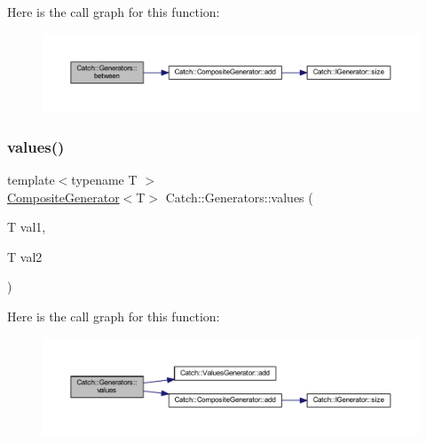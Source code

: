 Here is the call graph for this function\+:\nopagebreak
\begin{figure}[H]
\begin{center}
\leavevmode
\includegraphics[width=350pt]{namespace_catch_1_1_generators_a030abfa7ee3c58d909cf6a6aa0405265_cgraph}
\end{center}
\end{figure}
\hypertarget{namespace_catch_1_1_generators_a7a2c5bebb3c06c5b0ca05a80289b9eb1}{}\label{namespace_catch_1_1_generators_a7a2c5bebb3c06c5b0ca05a80289b9eb1} 
\subsubsection{\texorpdfstring{values()}{values()}\hspace{0.1cm}{\footnotesize\ttfamily [1/3]}}
{\footnotesize\ttfamily template$<$typename T $>$ \\
\hyperlink{class_catch_1_1_composite_generator}{Composite\+Generator}$<$T$>$ Catch\+::\+Generators\+::values (\begin{DoxyParamCaption}\item[{T}]{val1,  }\item[{T}]{val2 }\end{DoxyParamCaption})}

Here is the call graph for this function\+:\nopagebreak
\begin{figure}[H]
\begin{center}
\leavevmode
\includegraphics[width=350pt]{namespace_catch_1_1_generators_a7a2c5bebb3c06c5b0ca05a80289b9eb1_cgraph}
\end{center}
\end{figure}
\hypertarget{namespace_catch_1_1_generators_a496c4a826107e47203b6c609cfd8c2c5}{}\label{namespace_catch_1_1_generators_a496c4a826107e47203b6c609cfd8c2c5} 

